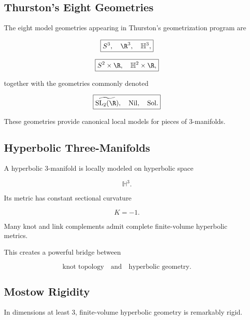\subsection{Thurston's Eight Geometries}
\label{subsec:thurston-eight-geometries}

The eight model geometries appearing in Thurston's geometrization program
are

\[
\boxed{
S^3,
\quad
\R^3,
\quad
\mathbb{H}^3,
}
\]

\[
\boxed{
S^2\times\R,
\quad
\mathbb{H}^2\times\R,
}
\]

together with the geometries commonly denoted

\[
\boxed{
\widetilde{\mathrm{SL}_2(\R)},
\quad
\mathrm{Nil},
\quad
\mathrm{Sol}.
}
\]

These geometries provide canonical local models for pieces of
\(3\)-manifolds.

\subsection{Hyperbolic Three-Manifolds}
\label{subsec:hyperbolic-three-manifolds}

A hyperbolic \(3\)-manifold is locally modeled on hyperbolic space

\[
\boxed{
\mathbb{H}^3.
}
\]

Its metric has constant sectional curvature

\[
\boxed{
K=-1.
}
\]

Many knot and link complements admit complete finite-volume hyperbolic
metrics.

This creates a powerful bridge between

\[
\boxed{
\text{knot topology}
\quad\text{and}\quad
\text{hyperbolic geometry}.
}
\]

\subsection{Mostow Rigidity}
\label{subsec:mostow-rigidity}

In dimensions at least \(3\), finite-volume hyperbolic geometry is remarkably
rigid.

